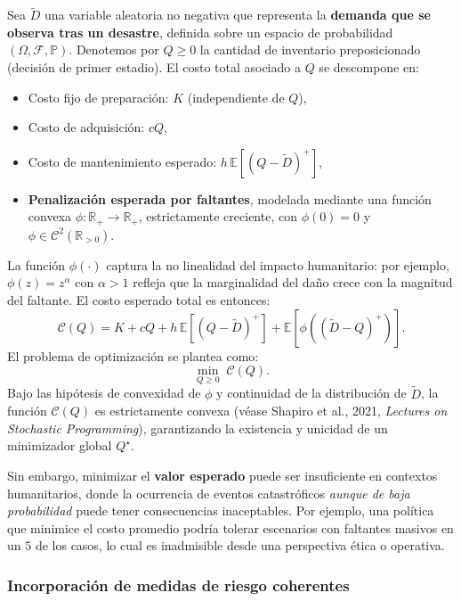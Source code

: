 \documentclass[
  spanish,
  us-letterpaper,
  DIV=11,
  numbers=noendperiod]{scrreprt}
\providecommand{\tightlist}{%
  \setlength{\itemsep}{0pt}\setlength{\parskip}{0pt}}
\numberwithin{equation}{section}
\begin{document}
Sea \(\tilde{D}\) una variable aleatoria no negativa que representa la
\textbf{demanda que se observa tras un desastre}, definida sobre un
espacio de probabilidad \((\Omega, \mathcal{F}, \mathbb{P})\). Denotemos
por \(Q \geq 0\) la cantidad de inventario preposicionado (decisión de
primer estadio). El costo total asociado a \(Q\) se descompone en:

\begin{itemize}
\tightlist
\item
  Costo fijo de preparación: \(K\) (independiente de \(Q\)),\\
\item
  Costo de adquisición: \(c Q\),\\
\item
  Costo de mantenimiento esperado:
  \(h \, \mathbb{E}[(Q - \tilde{D})^+]\),\\
\item
  \textbf{Penalización esperada por faltantes}, modelada mediante una
  función convexa \(\phi: \mathbb{R}_+ \to \mathbb{R}_+\), estrictamente
  creciente, con \(\phi(0) = 0\) y
  \(\phi \in \mathcal{C}^2(\mathbb{R}_{>0})\).
\end{itemize}

La función \(\phi(\cdot)\) captura la no linealidad del impacto
humanitario: por ejemplo, \(\phi(z) = z^\alpha\) con \(\alpha > 1\)
refleja que la marginalidad del daño crece con la magnitud del faltante.
El costo esperado total es entonces: \[
\mathcal{C}(Q) = K + c Q + h \, \mathbb{E}[(Q - \tilde{D})^+] + \mathbb{E}[\phi((\tilde{D} - Q)^+)].
\] El problema de optimización se plantea como: \[
\min_{Q \geq 0} \; \mathcal{C}(Q).
\] Bajo las hipótesis de convexidad de \(\phi\) y continuidad de la
distribución de \(\tilde{D}\), la función \(\mathcal{C}(Q)\) es
estrictamente convexa (véase Shapiro et al., 2021, \emph{Lectures on
Stochastic Programming}), garantizando la existencia y unicidad de un
minimizador global \(Q^\star\).

Sin embargo, minimizar el \textbf{valor esperado} puede ser insuficiente
en contextos humanitarios, donde la ocurrencia de eventos catastróficos
\emph{aunque de baja probabilidad} puede tener consecuencias
inaceptables. Por ejemplo, una política que minimice el costo promedio
podría tolerar escenarios con faltantes masivos en un \(5%
\) de los casos, lo cual es inadmisible desde una perspectiva ética o
operativa.

\subsubsection{Incorporación de medidas de riesgo
coherentes}\label{incorporaciuxf3n-de-medidas-de-riesgo-coherentes}
\end{document}
